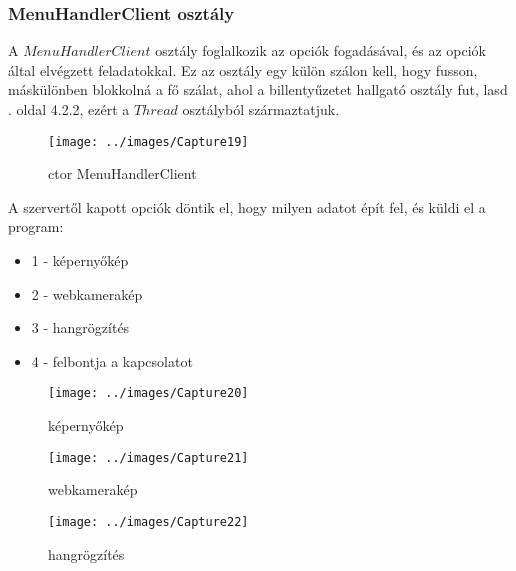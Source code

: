 \documentclass[a4paper, 11pt]{article}
\begin{document}
\subsubsection{MenuHandlerClient osztály}\label{subsubsec:menuhandlerclinet}
A $MenuHandlerClient$ osztály foglalkozik az opciók fogadásával, és az opciók által elvégzett feladatokkal. Ez az osztály egy külön szálon kell, hogy fusson, máskülönben blokkolná a fő szálat, ahol a billentyűzetet hallgató osztály fut, lasd \pageref{subsubsec:keyloggerclientclass}. oldal 4.2.2, ezért a $Thread$ osztályból származtatjuk.
\begin{figure}[H]
\centering
\texttt{[image: ../images/Capture19]}
\caption{ctor MenuHandlerClient}
\label{fig:ctormenuhandlerclient}
\end{figure}
A szervertől kapott opciók döntik el, hogy milyen adatot épít fel, és küldi el a program:
\begin{itemize}
\item 1 - képernyőkép
\item 2 - webkamerakép
\item 3 - hangrögzítés
\item 4 - felbontja a kapcsolatot
\end{itemize}
\begin{figure}[H]
\centering
\texttt{[image: ../images/Capture20]}
\caption{képernyőkép}
\label{fig:image}
\end{figure}
\begin{figure}[H]
\centering
\texttt{[image: ../images/Capture21]}
\caption{webkamerakép}
\label{fig:wcpic}
\end{figure}
\begin{figure}[H]
\centering
\texttt{[image: ../images/Capture22]}
\caption{hangrögzítés}
\label{fig:audio}
\end{figure}

\end{document}
